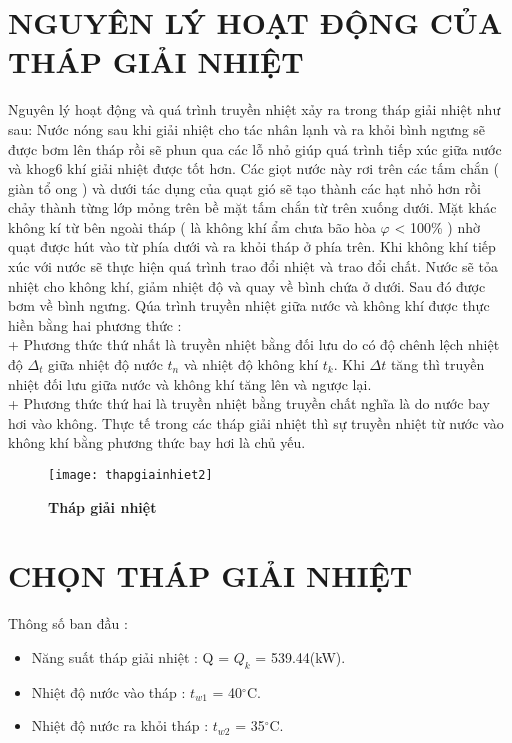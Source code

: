 \section{NGUYÊN LÝ HOẠT ĐỘNG CỦA THÁP GIẢI NHIỆT}

Nguyên lý hoạt động và quá trình truyền nhiệt xảy ra trong tháp giải nhiệt như sau: Nước nóng sau khi giải nhiệt cho tác nhân lạnh và ra khỏi bình ngưng sẽ được bơm lên tháp rồi sẽ phun qua các lỗ nhỏ giúp quá trình tiếp xúc giữa nước và khog6 khí giải nhiệt được tốt hơn. Các giọt nước này rơi trên các tấm chắn ( giàn tổ ong ) và dưới tác dụng của quạt gió sẽ tạo thành các hạt nhỏ hơn rồi chảy thành từng lớp mỏng trên bề mặt tấm chắn từ trên xuống dưới. Mặt khác không kí từ bên ngoài tháp ( là không khí ẩm chưa bão hòa $\varphi$ < 100\% ) nhờ quạt được hút vào từ phía dưới và ra khỏi tháp ở phía trên. Khi không khí tiếp xúc với nước sẽ thực hiện quá trình trao đổi nhiệt và trao đổi chất. Nước sẽ tỏa nhiệt cho không khí, giảm nhiệt độ và quay về bình chứa ở dưới. Sau đó được bơm về bình ngưng. Qúa trình truyền nhiệt giữa nước và không khí được thực hiền bằng hai phương thức : \\
+ Phương thức thứ nhất là truyền nhiệt bằng đối lưu do có độ chênh lệch nhiệt độ $\Delta_{t}$ giữa nhiệt độ nước $t_{n}$ và nhiệt độ không khí $t_{k}$. Khi $\Delta t$ tăng thì truyền nhiệt đối lưu giữa nước và không khí tăng lên và ngược lại.\\
+ Phương thức thứ hai là truyền nhiệt bằng truyền chất nghĩa là do nước bay hơi vào không. Thực tế trong các tháp giải nhiệt thì sự truyền nhiệt từ nước vào không khí bằng phương thức bay hơi là chủ yếu.\\

\begin{figure}[H]
	\centering
	\texttt{[image: thapgiainhiet2]}
	\caption{\textbf{Tháp giải nhiệt}}
	\label{thapgiainhiet2}
\end{figure}

\section{CHỌN THÁP GIẢI NHIỆT}
Thông số ban đầu :
\begin{itemize}
	\item Năng suất tháp giải nhiệt : Q = $ Q_{k}$ = 539.44(kW).
	\item Nhiệt độ nước vào tháp : $t_{w1}$ = 40$^{\circ}$C.
	\item Nhiệt độ nước ra khỏi tháp : $t_{w2}$ = 35$^{\circ}$C.
\end{itemize}

